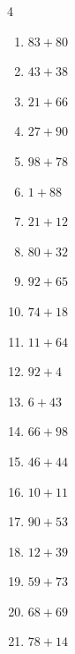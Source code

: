 \begin{multicols}{4}
\begin{enumerate}
  \item $83+80$
        \phantom{$=163$}

  \item $43+38$
        \phantom{$=81$}

  \item $21+66$
        \phantom{$=87$}

  \item $27+90$
        \phantom{$=117$}

  \item $98+78$
        \phantom{$=176$}

  \item $1+88$
        \phantom{$=89$}

  \item $21+12$
        \phantom{$=33$}

  \item $80+32$
        \phantom{$=112$}

\columnbreak %

  \item $92+65$
        \phantom{$=157$}

  \item $74+18$
        \phantom{$=92$}

  \item $11+64$
        \phantom{$=75$}

  \item $92+4$
        \phantom{$=96$}

  \item $6+43$
        \phantom{$=49$}

  \item $66+98$
        \phantom{$=164$}

  \item $46+44$
        \phantom{$=90$}

  \item $10+11$
        \phantom{$=21$}

  \item $90+53$
        \phantom{$=143$}

  \item $12+39$
        \phantom{$=51$}

  \item $59+73$
        \phantom{$=132$}

  \item $68+69$
        \phantom{$=137$}

  \item $78+14$
        \phantom{$=92$}


\end{enumerate}
\end{multicols}
